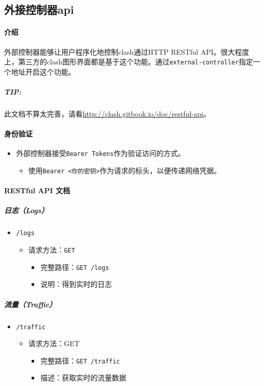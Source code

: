 \subsection{外接控制器api}

\paragraph{介绍} 外部控制器能够让用户程序化地控制clash通过HTTP RESTful API。很大程度上，第三方的clash图形界面都是基于这个功能。通过\verb|external-controller|指定一个地址开启这个功能。

\subparagraph{TIP:}此文档不算太完善，请看\url{http://clash.gitbook.io/doc/restful-api}。

\paragraph{身份验证}
\begin{itemize}
    \item 外部控制器接受\verb|Bearer Tokens|作为验证访问的方式。
        \begin{itemize}
            \item 使用\verb|Bearer <你的密钥>|作为请求的标头，以便传递网络凭据。
        \end{itemize}
\end{itemize}

\paragraph{RESTful API 文档}

\subparagraph{日志（Logs）} 
\begin{itemize}
    \item \verb|/logs|
        \begin{itemize}
            \item 请求方法：\verb|GET|
                \begin{itemize}
                    \item 完整路径：\verb|GET /logs|
                    \item 说明：得到实时的日志
                \end{itemize}
        \end{itemize}
\end{itemize}

\subparagraph{流量（Traffic）}
\begin{itemize}
    \item \verb|/traffic|
    \begin{itemize}
        \item 请求方法：GET
        \begin{itemize}
            \item 完整路径：\verb|GET /traffic|
            \item 描述：获取实时的流量数据
        \end{itemize}
    \end{itemize}
\end{itemize}

